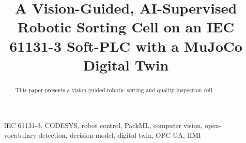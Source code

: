 \documentclass[conference]{IEEEtran}
\begin{document}
\title{A Vision-Guided, AI-Supervised Robotic Sorting Cell on an IEC 61131-3 Soft-PLC with a MuJoCo Digital Twin}

\author{
}

\maketitle

\begin{abstract}
This paper presents a vision-guided robotic sorting and quality-inspection cell.
\end{abstract}

\begin{IEEEkeywords}
IEC 61131-3, CODESYS, robot control, PackML, computer vision, open-vocabulary detection,
decision model, digital twin, OPC UA, HMI
\end{IEEEkeywords}














\end{document}

